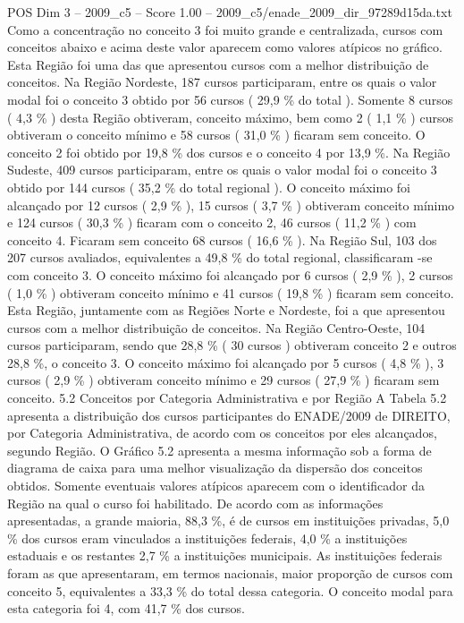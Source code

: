\begin{textsample}{POS Dim 3 – 2009\_c5 – Score 1.00 – 2009\_c5/enade\_2009\_dir\_97289d15da.txt}
Como a concentração no conceito 3 foi muito grande e centralizada, cursos com conceitos abaixo e acima deste valor aparecem como valores atípicos no gráfico.
Esta Região foi uma das que apresentou cursos com a melhor distribuição de conceitos.
Na Região Nordeste, 187 cursos participaram, entre os quais o valor modal foi o conceito 3 obtido por 56 cursos ( 29,9 \% do total ).
Somente 8 cursos ( 4,3 \% ) desta Região obtiveram, conceito máximo, bem como 2 ( 1,1 \% ) cursos obtiveram o conceito mínimo e 58 cursos ( 31,0 \% ) ficaram sem conceito.
O conceito 2 foi obtido por 19,8 \% dos cursos e o conceito 4 por 13,9 \%.
Na Região Sudeste, 409 cursos participaram, entre os quais o valor modal foi o conceito 3 obtido por 144 cursos ( 35,2 \% do total regional ).
O conceito máximo foi alcançado por 12 cursos ( 2,9 \% ), 15 cursos ( 3,7 \% ) obtiveram conceito mínimo e 124 cursos ( 30,3 \% ) ficaram com o conceito 2, 46 cursos ( 11,2 \% ) com conceito 4.
Ficaram sem conceito 68 cursos ( 16,6 \% ).
Na Região Sul, 103 dos 207 cursos avaliados, equivalentes a 49,8 \% do total regional, classificaram -se com conceito 3.
O conceito máximo foi alcançado por 6 cursos ( 2,9 \% ), 2 cursos ( 1,0 \% ) obtiveram conceito mínimo e 41 cursos ( 19,8 \% ) ficaram sem conceito.
Esta Região, juntamente com as Regiões Norte e Nordeste, foi a que apresentou cursos com a melhor distribuição de conceitos.
Na Região Centro-Oeste, 104 cursos participaram, sendo que 28,8 \% ( 30 cursos ) obtiveram conceito 2 e outros 28,8 \%, o conceito 3.
O conceito máximo foi alcançado por 5 cursos ( 4,8 \% ), 3 cursos ( 2,9 \% ) obtiveram conceito mínimo e 29 cursos ( 27,9 \% ) ficaram sem conceito. 5.2 Conceitos por Categoria Administrativa e por Região A Tabela 5.2 apresenta a distribuição dos cursos participantes do ENADE/2009 de DIREITO, por Categoria Administrativa, de acordo com os conceitos por eles alcançados, segundo Região.
O Gráfico 5.2 apresenta a mesma informação sob a forma de diagrama de caixa para uma melhor visualização da dispersão dos conceitos obtidos.
Somente eventuais valores atípicos aparecem com o identificador da Região na qual o curso foi habilitado.
De acordo com as informações apresentadas, a grande maioria, 88,3 \%, é de cursos em instituições privadas, 5,0 \% dos cursos eram vinculados a instituições federais, 4,0 \% a instituições estaduais e os restantes 2,7 \% a instituições municipais.
As instituições federais foram as que apresentaram, em termos nacionais, maior proporção de cursos com conceito 5, equivalentes a 33,3 \% do total dessa categoria.
O conceito modal para esta categoria foi 4, com 41,7 \% dos cursos.

\end{textsample}

